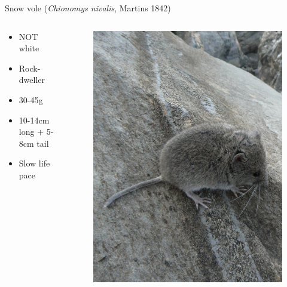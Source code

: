 \documentclass[10pt]{beamer}%
\begin{document}
\begin{frame}{Snow vole (\textit{Chionomys nivalis}, Martins 1842)}

\begin{columns}
	\begin{column}[c]{0.5\textwidth}
		\begin{itemize}[<+->]
			\item NOT white
			\item Rock-dweller
			\item 30-45g
			\item 10-14cm long $+$ 5-8cm tail
			\item Slow life pace
		\end{itemize}
	\end{column}
	\begin{column}[c]{0.5\textwidth}
	\begin{figure}
	\centering
		\includegraphics[width= \textwidth]{Figures/P1250035}
	\end{figure}
	\end{column}
	\end{columns}
\end{frame}
\end{document}
